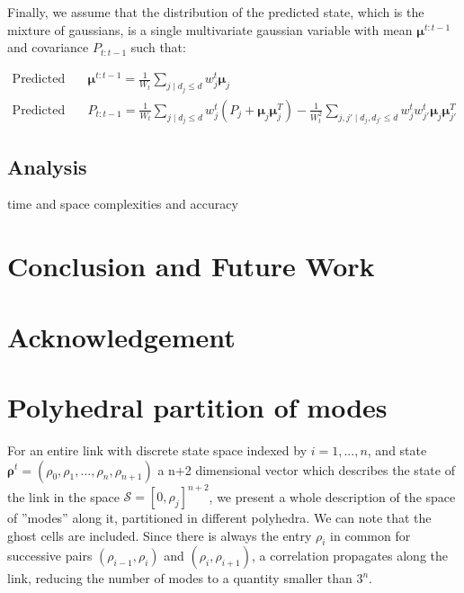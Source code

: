 \documentclass[11pt]{article}
\numberwithin{equation}{section}
\numberwithin{figure}{section}
\numberwithin{table}{section}
\begin{document}
Finally, we assume that the distribution of the predicted state, which is the mixture of gaussians, is a single multivariate gaussian variable with mean $\boldsymbol \mu^{t:t-1}$ and covariance $P_{t:t-1}$ such that:

\begin{equation}
\begin{array}{ll}
\text{Predicted state: } & \boldsymbol \mu^{t:t-1} = \frac{1}{W_{t}}\sum_{j\mid d_{j}\leq d}{w_{j}^{t}\boldsymbol\mu_{j}}\\
\text{Predicted covariance: } & P_{t:t-1} = \frac{1}{W_{t}}\sum_{j\mid d_{j}\leq d}{w_{j}^{t}\left(P_{j} + \boldsymbol\mu_{j} \boldsymbol\mu^{T}_{j}\right)} - \frac{1}{W^{2}_{t}}\sum_{j,j'\mid d_{j},d_{j'}\leq d}{w_{j}^{t}w_{j'}^{t}\boldsymbol\mu_{j} \boldsymbol\mu^{T}_{j'}}
\end{array}
\label{eq:mixture6}
\end{equation}


\subsection{Analysis}

time and space complexities and accuracy

\section{Conclusion and Future Work}

\section{Acknowledgement}

\appendix

\section{Polyhedral partition of modes}

For an entire link with discrete state space indexed by $i = 1,...,n$, and state $\boldsymbol\rho^{t} = (\rho_{0},\rho_{1},...,\rho_{n},\rho_{n+1})$ a n+2 dimensional vector which describes the state of the link in the space $\mathcal{S} = [0,\rho_{j}]^{n+2}$, we present a whole description of the space of ''modes'' along it, partitioned in different polyhedra. We can note that the ghost cells are included. Since there is always the entry $\rho_{i}$ in common for successive pairs $(\rho_{i-1},\rho_{i})$ and $(\rho_{i},\rho_{i+1})$, a correlation propagates along the link, reducing the number of modes to a quantity smaller than $3^{n}$.
\end{document}
